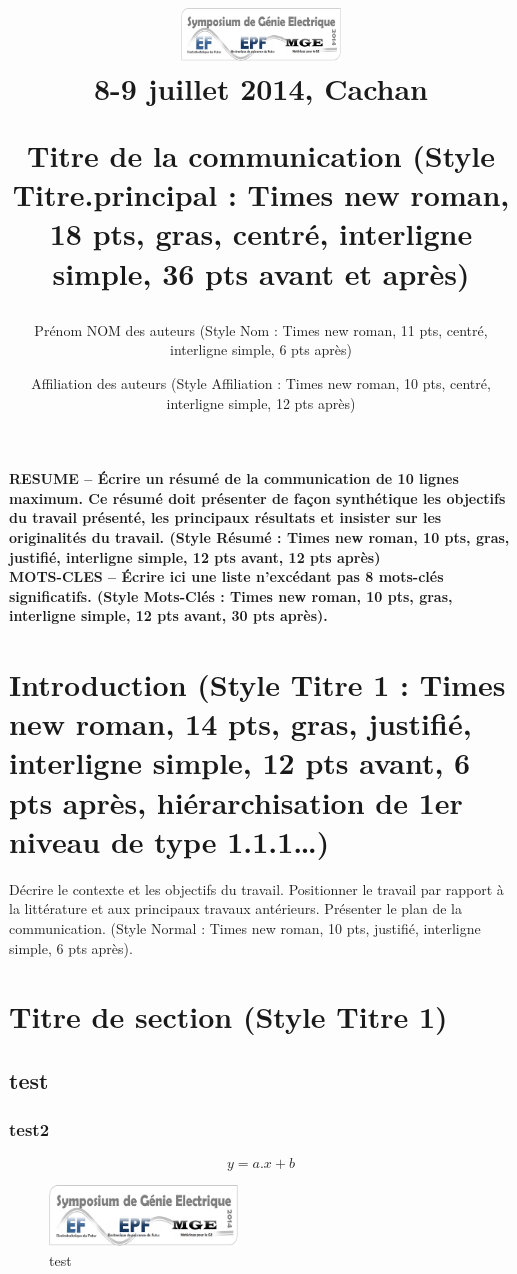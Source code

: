 \documentclass[10pt]{article}
\title{
\vspace*{-0.5cm}
\begin{flushright}
\includegraphics[width=4.25cm]{logo_sge.png}\\
\normalsize{8-9 juillet 2014, Cachan}
\end{flushright}
\vspace*{36pt}
\fontsize{18}{18}\selectfont
\textbf{
Titre de la communication (Style Titre.principal : Times new roman, 18 pts, gras, centré, interligne simple, 36 pts avant et après)
}
\normalsize
\vspace*{12pt}}
\author{Prénom NOM des auteurs (Style Nom : Times new roman, 11 pts, centré, interligne simple, 6 pts après) \normalsize}
\date{\normalsize{Affiliation des auteurs (Style Affiliation : Times new roman, 10 pts, centré, interligne simple, 12 pts après)}}
\begin{document}
\maketitle

\thispagestyle{empty}

\noindent \textbf{RESUME -- Écrire un résumé de la communication de 10 lignes maximum. Ce résumé doit présenter de façon synthétique les objectifs du travail présenté, les principaux résultats et insister sur les originalités du travail. (Style Résumé : Times new roman, 10 pts, gras, justifié, interligne simple, 12 pts avant, 12 pts après)}\\[12pt]
\textbf{MOTS-CLES -- Écrire ici une liste n'excédant pas 8 mots-clés significatifs. (Style Mots-Clés : Times new roman, 10 pts, gras, interligne simple, 12 pts avant, 30 pts après).}

\vspace*{12pt}

\section{Introduction (Style Titre 1 : Times new roman, 14 pts, gras, justifié, interligne simple, 12 pts avant, 6 pts après, hiérarchisation de 1er niveau de type 1.1.1\ldots)}

\noindent Décrire le contexte et les objectifs du travail. Positionner le travail par rapport à la littérature et aux principaux travaux antérieurs. Présenter le plan de la communication. (Style Normal : Times new roman, 10 pts, justifié, interligne simple, 6 pts après).


\section{Titre de section (Style Titre 1)}
\subsection{test}
\subsubsection{test2}

\begin{equation}
y=a.x+b
\label{eq_homog}
\end{equation}

\begin{figure}[!htbp]
\centering
\includegraphics[width=5cm]{logo_sge.png}
\caption{test}
\end{figure}
\end{document}
